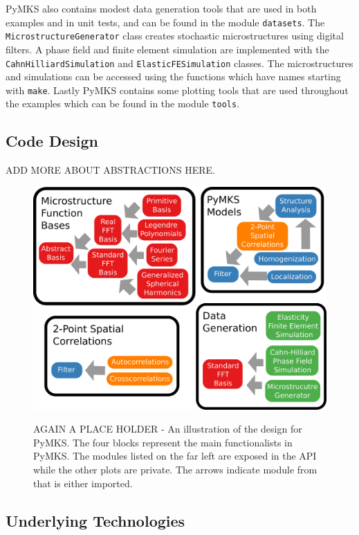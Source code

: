 \documentclass{bmcart}
\begin{document}
PyMKS also contains modest data generation tools that are used in both examples and in unit tests, and can be found in the module \texttt{datasets}. The \texttt{MicrostructureGenerator} class creates stochastic microstructures using digital filters. A phase field and finite element simulation are implemented with the \texttt{CahnHilliardSimulation} and \texttt{ElasticFESimulation} classes. The microstructures and simulations can be accessed using the functions which have names starting with \texttt{make}. Lastly PyMKS contains some plotting tools that are used throughout the examples which can be found in the module \texttt{tools}.

\subsection{Code Design}

ADD MORE ABOUT ABSTRACTIONS HERE.

\begin{figure}[h!]
  \caption{
      AGAIN A PLACE HOLDER - An illustration of the design for PyMKS. The four blocks represent the main functionalists in PyMKS. The modules listed on the far left are exposed in the API  while the other plots are private. The arrows indicate module from
      that is either imported.}
    \includegraphics[scale=.5]{fig/pymksOrganization3.png}
  \label{fig:pymks_design}
\end{figure}


\subsection{Underlying Technologies}
\end{document}
